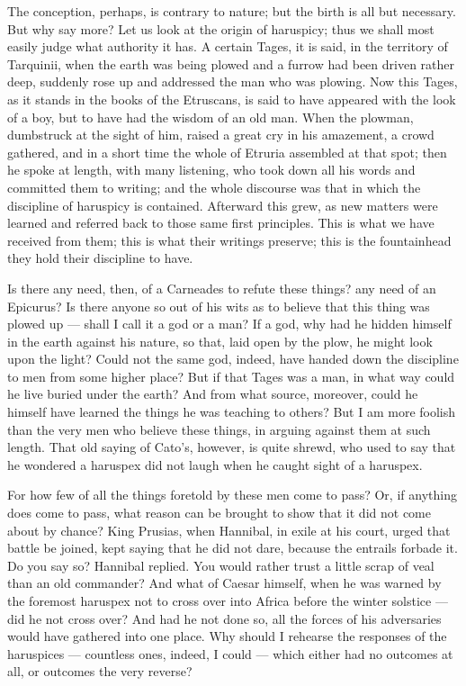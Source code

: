  The conception, perhaps, is contrary to nature; but the birth is all but necessary. But why say more? Let us look at the origin of haruspicy; thus we shall most easily judge what authority it has. A certain Tages, it is said, in the territory of Tarquinii, when the earth was being plowed and a furrow had been driven rather deep, suddenly rose up and addressed the man who was plowing. Now this Tages, as it stands in the books of the Etruscans, is said to have appeared with the look of a boy, but to have had the wisdom of an old man. When the plowman, dumbstruck at the sight of him, raised a great cry in his amazement, a crowd gathered, and in a short time the whole of Etruria assembled at that spot; then he spoke at length, with many listening, who took down all his words and committed them to writing; and the whole discourse was that in which the discipline of haruspicy is contained. Afterward this grew, as new matters were learned and referred back to those same first principles. This is what we have received from them; this is what their writings preserve; this is the fountainhead they hold their discipline to have.

 Is there any need, then, of a Carneades to refute these things? any need of an Epicurus? Is there anyone so out of his wits as to believe that this thing was plowed up — shall I call it a god or a man? If a god, why had he hidden himself in the earth against his nature, so that, laid open by the plow, he might look upon the light? Could not the same god, indeed, have handed down the discipline to men from some higher place? But if that Tages was a man, in what way could he live buried under the earth? And from what source, moreover, could he himself have learned the things he was teaching to others? But I am more foolish than the very men who believe these things, in arguing against them at such length. That old saying of Cato's, however, is quite shrewd, who used to say that he wondered a haruspex did not laugh when he caught sight of a haruspex.

 For how few of all the things foretold by these men come to pass? Or, if anything does come to pass, what reason can be brought to show that it did not come about by chance? King Prusias, when Hannibal, in exile at his court, urged that battle be joined, kept saying that he did not dare, because the entrails forbade it. Do you say so? Hannibal replied. You would rather trust a little scrap of veal than an old commander? And what of Caesar himself, when he was warned by the foremost haruspex not to cross over into Africa before the winter solstice — did he not cross over? And had he not done so, all the forces of his adversaries would have gathered into one place. Why should I rehearse the responses of the haruspices — countless ones, indeed, I could — which either had no outcomes at all, or outcomes the very reverse?

